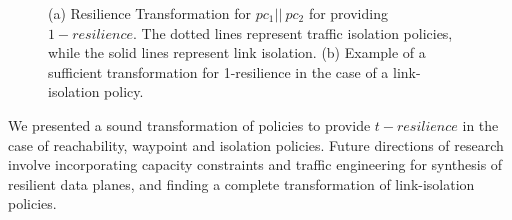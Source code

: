 \begin{figure}
	\centering
	\caption{\label{fig:restransform}
		(a) Resilience Transformation for $pc_1 || \ pc_2$ for providing $1-resilience$. 
		The dotted lines represent traffic isolation policies, 
		while the solid lines represent link isolation. (b) Example of a sufficient transformation
		for 1-resilience in the case of a link-isolation policy.}
\end{figure}

We presented a sound transformation of policies to provide $t-resilience$ in
the case of reachability, waypoint and isolation policies. Future directions of 
research involve incorporating capacity constraints and traffic engineering
for synthesis of resilient data planes, and finding a complete transformation of
link-isolation policies. 